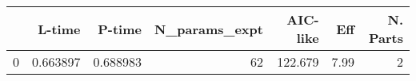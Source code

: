 \begin{tabular}{lrrrrrr}
\toprule
{} &    L-time &    P-time &  N\_params\_expt &  AIC-like &   Eff &  N. Parts \\
\midrule
0 &  0.663897 &  0.688983 &             62 &   122.679 &  7.99 &         2 \\
\bottomrule
\end{tabular}

